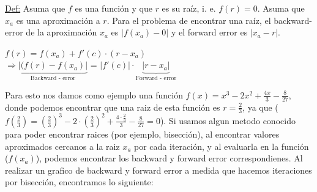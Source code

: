 \underline{Def:} Asuma que \(f\) es una función y que \(r\) es su raíz, i. e. \(f(r) = 0\). Asuma que \(x_a\) es una aproximación a \(r\).
Para el problema de encontrar una raíz, el backward-error de la aproximación \(x_a\) es \(|f(x_a) - 0|\) y el forward error es \(|x_a - r|\).\\
\vspace{0.2cm}
\begin{center}
\(f(r) = f(x_a) + f'(c) \cdot (r-x_a)\) \\
\vspace{0.3cm}
$\Rightarrow \underbrace{|(f(r) - f(x_a)|}_{\text{Backward - error}}$ = $|f'(c)| \cdot \underbrace{|r - x_a|}_{\text{Forward - error}}$ \\
\end{center}
\vspace{0.2cm}

Para esto nos damos como ejemplo una función $f(x) = x^3 - 2x^2 + \frac{4x}{3} - \frac{8}{27}$, donde podemos encontrar que una raiz de esta función es $r = \frac{2}{3}$, ya que  ($f(\frac{2}{3}) = (\frac{2}{3})^3 - 2\cdot (\frac{2}{3})^2 + \frac{4\cdot \frac{2}{3}}{3} - \frac{8}{27} = 0$). Si usamos algun metodo conocido para poder encontrar raices (por ejemplo, bisección), al encontrar valores aproximados cercanos a la raiz $x_a$ por cada iteración, y al evaluarla en la función ($f(x_a)$), podemos encontrar los backward y forward error correspondienes. Al realizar un grafico de backward y forward error a medida que hacemos iteraciones por bisección, encontramos lo siguiente:

